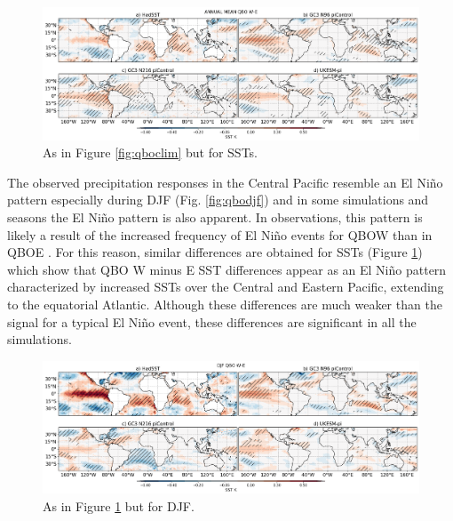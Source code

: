 \begin{figure}[t!]
\centering
 \includegraphics[width=\linewidth]{figures/pisstclimqbowqboe.png}
\caption[Annual mean SST difference QBO W-E under different QBO phases.]{ As in Figure \ref{fig:qboclim} but for SSTs.}
\label{fig:sstclim}
\end{figure}

The observed precipitation responses in the Central Pacific resemble an El Niño pattern especially during DJF (Fig. \ref{fig:qbodjf}) and in some simulations and seasons the El Niño pattern is also apparent. In observations, this pattern is likely a result of the increased frequency of El Niño events for QBOW than in QBOE \citep{liess2012}. 
For this reason, similar differences are obtained for SSTs (Figure \ref{fig:sstclim}) which show that  QBO W minus E SST differences appear as an El Niño pattern characterized by increased SSTs over the Central and Eastern Pacific, extending to the equatorial Atlantic. 
Although these differences are much weaker than the signal for a typical El Niño event, these differences are significant in all the simulations.%

\begin{figure}[t!]
\centering
 \includegraphics[width=\linewidth]{figures/pisstdjfqbowqboe.png}
\caption[DJF mean SST difference QBO W-E under different QBO phases.]{ As in Figure \ref{fig:sstclim} but for DJF.}
\label{fig:djfclim}
\end{figure}

